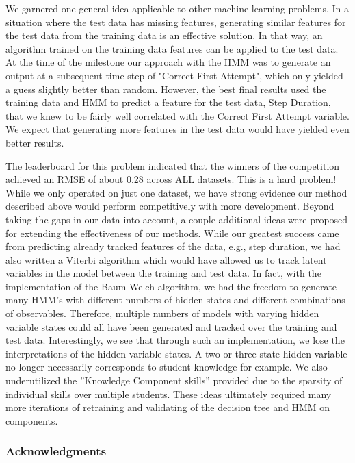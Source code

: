 \documentclass{article} %
\begin{document}
We garnered one general idea applicable to other machine learning problems. In a situation where the test data has missing features, generating similar features for the test data from the training data is an effective solution. In that way, an algorithm trained on the training data features can be applied to the test data. At the time of the milestone our approach with the HMM was to generate an output at a subsequent time step of "Correct First Attempt", which only yielded a guess slightly better than random. However, the best final results used the training data and HMM to predict a feature for the test data, Step Duration, that we knew to be fairly well correlated with the Correct First Attempt variable. We expect that generating more features in the test data would have yielded even better results.

The leaderboard for this problem indicated that the winners of the competition achieved an RMSE of about 0.28 across ALL datasets. This is a hard problem! While we only operated on just one dataset, we have strong evidence our method described above would perform competitively with more development. Beyond taking the gaps in our data into account, a couple additional ideas were proposed for extending the effectiveness of our methods. While our greatest success came from predicting already tracked features of the data, e.g., step duration, we had also written a Viterbi algorithm which would have allowed us to track latent variables in the model between the training and test data. In fact, with the implementation of the Baum-Welch algorithm, we had the freedom to generate many HMM's with different numbers of hidden states and different combinations of observables. Therefore, multiple numbers of models with varying hidden variable states could all have been generated and tracked over the training and test data. Interestingly, we see that through such an implementation, we lose the interpretations of the hidden variable states. A two or three state hidden variable no longer necessarily corresponds to student knowledge for example. We also underutilized the ''Knowledge Component skills'' provided due to the sparsity of individual skills over multiple students. These ideas ultimately required many more iterations of retraining and validating of the decision tree and HMM on components.

\subsubsection*{Acknowledgments}
\end{document}
